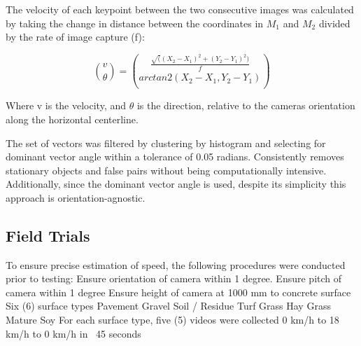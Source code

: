 The velocity of each keypoint between the two consecutive images was
calculated by taking the change in distance between the coordinates in $M_{1}$ and
$M_{2}$ divided by the rate of image capture (f):

\begin{equation}
\binom{v}{\theta} = \binom{\frac{\sqrt((X_{2} - X_{1})^2 + (Y_{2} - Y_{1})^2)}{f}}{arctan2(X_{2} - X_{1}, Y_{2} - Y_{1})}
\label{eq:pts2vector}
\end{equation}
\begin{flushleft}
Where v is the velocity, and $\theta$ is the direction, relative to
the cameras orientation along the horizontal centerline.
\end{flushleft}

The set of vectors was filtered by clustering by histogram and
selecting for dominant vector angle within a tolerance of 0.05
radians. Consistently removes stationary objects and false pairs
without being computationally intensive. Additionally, since the
dominant vector angle is used, despite its simplicity this approach is
orientation-agnostic.

\subsection{Field Trials}
To ensure precise estimation of speed, the following procedures were conducted prior to testing:
Ensure orientation of camera within 1 degree.
Ensure pitch of camera within 1 degree
Ensure height of camera at 1000 mm to concrete surface
Six (6) surface types
Pavement
Gravel
Soil / Residue
Turf Grass
Hay Grass
Mature Soy
For each surface type, five (5) videos were collected
0 km/h to 18 km/h to 0 km/h in ~45 seconds

\begin{table}[h]
  \centering
  \caption{RMSE and 95$^{th}$ Percentile
    with respect to crop-stage.} 
  \label{table:trials}
\end{table}

